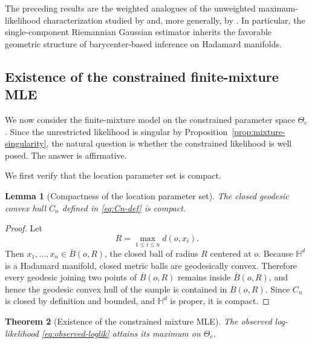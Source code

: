 \documentclass[11pt]{article}
\newtheorem{theorem}{Theorem}[section]
\newtheorem{lemma}[theorem]{Lemma}
\begin{document}
The preceding results are the weighted analogues of the unweighted maximum-likelihood characterization studied by \cite{said_2018_GaussianDistributionsRiemannian} and, more generally, by \cite{chen_2024_RiemannianRadialDistributions}. In particular, the single-component Riemannian Gaussian estimator inherits the favorable geometric structure of barycenter-based inference on Hadamard manifolds.

\subsection{Existence of the constrained finite-mixture MLE}\label{subsec:mixture-existence}

We now consider the finite-mixture model on the constrained parameter space \(\Theta_c\). Since the unrestricted likelihood is singular by Proposition~\ref{prop:mixture-singularity}, the natural question is whether the constrained likelihood is well posed. The answer is affirmative.

We first verify that the location parameter set is compact.

\begin{lemma}[Compactness of the location parameter set]\label{lem:Cn-compact}
The closed geodesic convex hull \(C_n\) defined in \eqref{eq:Cn-def} is compact.
\end{lemma}

\begin{proof}
Let
\[
R=\max_{1\le i\le n} d(o,x_i).
\]
Then \(x_1,\ldots,x_n\in \overline{B}(o,R)\), the closed ball of radius \(R\) centered at \(o\). Because \(\mathbb{H}^d\) is a Hadamard manifold, closed metric balls are geodesically convex. Therefore every geodesic joining two points of \(\overline{B}(o,R)\) remains inside \(\overline{B}(o,R)\), and hence the geodesic convex hull of the sample is contained in \(\overline{B}(o,R)\). Since \(C_n\) is closed by definition and bounded, and \(\mathbb{H}^d\) is proper, it is compact.
\end{proof}

\begin{theorem}[Existence of the constrained mixture MLE]\label{thm:constrained-mle-exists}
The observed log-likelihood \eqref{eq:observed-loglik} attains its maximum on \(\Theta_c\).
\end{theorem}
\end{document}
